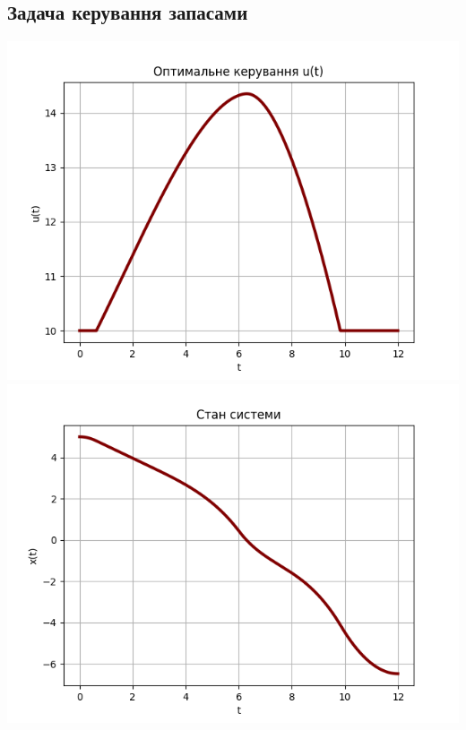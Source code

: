 \documentclass[a4paper,12pt]{extreport}
\begin{document}
\subsection{Задача керування запасами}
\includegraphics[height=10cm, width=15cm]{figures/stock_management_optimal_control.png} \newline
\includegraphics[height=10cm, width=15cm]{figures/State_1d_optimal_stock_management.png}
\end{document}
